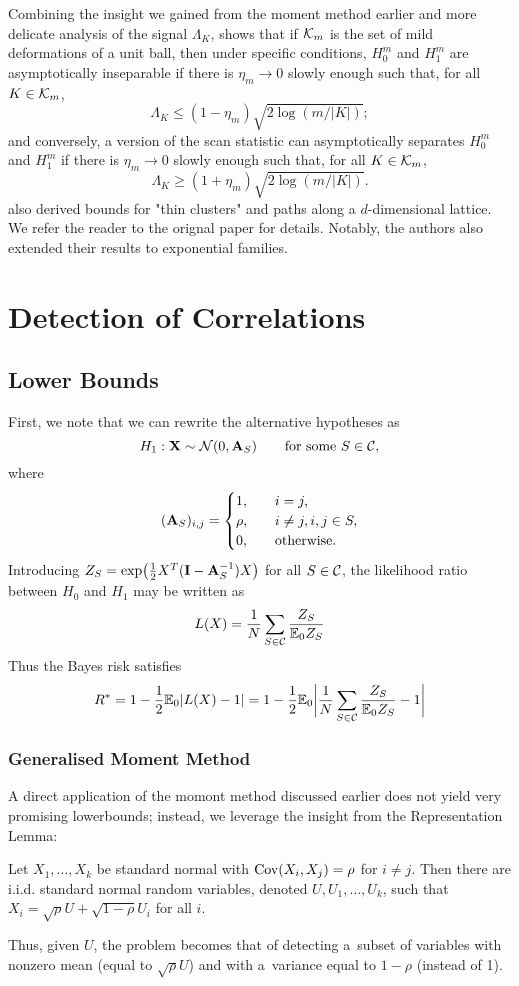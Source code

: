 \documentclass[10pt, oneside]{article}
\begin{document}
Combining the insight we gained from the moment method earlier and more delicate analysis of the signal $\Lambda_K$, \cite{arias2011detection} shows that if ${\mathcal K}_m$ is the set of mild deformations of a unit ball, then under specific conditions,
$H_0^m$ and $H_1^m$ are asymptotically inseparable if there is
$\eta_m \to0$ slowly enough such that, for all $K \in{\mathcal K}_m$,
%
\[
\Lambda_K \leq(1 - \eta_m) \sqrt{2 \log(m/|K|)};
\]
%
and conversely, a version of the scan statistic can asymptotically separates $H_0^m$ and $H_1^m$ if there is $\eta_m
\to0$ slowly enough such that, for all $K \in{\mathcal K}_m$,
%
\[
\Lambda_K \geq(1 + \eta_m) \sqrt{2 \log(m/|K|)}.
\]
\cite{arias2011detection} also derived bounds for "thin clusters" and paths along a $d$-dimensional lattice. We refer the reader to the orignal paper for details. Notably, the authors also extended their results to exponential families.

\section{Detection of Correlations}
\subsection{Lower Bounds}
First, we note that we can rewrite the alternative hypotheses as $$H_1: \mathbf{X} \sim{\mathcal N}(0,\mathbf{A}_S)\qquad\mbox{for some $S \in{\mathcal C}$,}$$ where
$$(\mathbf{A}_S)_{i,j} = \begin{cases}
1, &\quad i = j, \cr
\rho, &\quad i \neq j, i, j \in S, \cr
0, &\quad \text{otherwise}.
\end{cases}$$
Introducing $Z_S = \exp\bigl(\tfrac{1}{2} X^T (\mathbf{I}- \mathbf{A}_S^{-1}) X \bigr)$ for all $S \in{\mathcal C}$, the likelihood ratio between $H_0$ and $H_1$ may be written as $$L(X) = \frac{1}{N} \sum_{S \in{\mathcal C}} \frac{Z_S}{\mathbb{E}_0 Z_S}$$ Thus the Bayes risk satisfies
$$R^* = 1 - \frac{1}{2} \mathbb{E}_0 |L(X) - 1| = 1 - \frac{1}{2} \mathbb{E}_0\biggl| \frac{1}{N} \sum_{S \in{\mathcal C}} \frac{Z_S}{\mathbb{E}_0 Z_S} - 1\biggr|$$

\subsubsection{Generalised Moment Method}
A direct application of the momont method discussed earlier does not yield very promising lowerbounds; instead, we leverage the insight from the Representation Lemma:
\begin{lem}
  \label{lemrepresent}
  Let $X_1,\ldots, X_k$ be standard normal with $\operatorname{Cov}(X_i, X_j) = \rho
  $ for $i \neq j$. Then there are i.i.d. standard normal random
  variables, denoted $U, U_1,\ldots, U_k$, such that $X_i = \sqrt{\rho}
  U + \sqrt{1-\rho}   U_i$ for all $i$.
\end{lem}
Thus, given $U$, the problem becomes that of detecting a~subset of
variables with nonzero mean (equal to $\sqrt{\rho} U$) and with a~variance equal to $1-\rho$ (instead of 1). 
\end{document}
